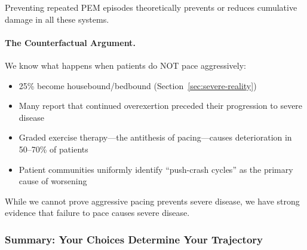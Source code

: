 Preventing repeated PEM episodes theoretically prevents or reduces cumulative damage in all these systems.

\paragraph{The Counterfactual Argument.}

We know what happens when patients do NOT pace aggressively:
\begin{itemize}
    \item 25\% become housebound/bedbound (Section~\ref{sec:severe-reality})
    \item Many report that continued overexertion preceded their progression to severe disease
    \item Graded exercise therapy---the antithesis of pacing---causes deterioration in 50--70\% of patients
    \item Patient communities uniformly identify ``push-crash cycles'' as the primary cause of worsening
\end{itemize}

While we cannot prove aggressive pacing prevents severe disease, we have strong evidence that failure to pace causes severe disease.

\subsubsection{Summary: Your Choices Determine Your Trajectory}
\label{sec:trajectory-summary}

